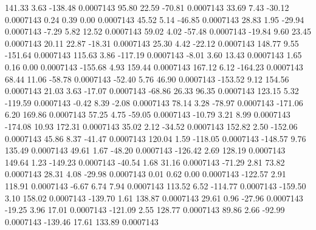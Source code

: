       141.33        3.63     -138.48     0.0007143
       95.80       22.59      -70.81     0.0007143
       33.69        7.43      -30.12     0.0007143
        0.24        0.39        0.00     0.0007143
       45.52        5.14      -46.85     0.0007143
       28.83        1.95      -29.94     0.0007143
       -7.29        5.82       12.52     0.0007143
       59.02        4.02      -57.48     0.0007143
      -19.84        9.60       23.45     0.0007143
       20.11       22.87      -18.31     0.0007143
       25.30        4.42      -22.12     0.0007143
      148.77        9.55     -151.64     0.0007143
      115.63        3.86     -117.19     0.0007143
       -8.01        3.60       13.43     0.0007143
        1.65        0.16        0.00     0.0007143
     -155.68        4.93      159.44     0.0007143
      167.12        6.12     -164.23     0.0007143
       68.44       11.06      -58.78     0.0007143
      -52.40        5.76       46.90     0.0007143
     -153.52        9.12      154.56     0.0007143
       21.03        3.63      -17.07     0.0007143
      -68.86       26.33       96.35     0.0007143
      123.15        5.32     -119.59     0.0007143
       -0.42        8.39       -2.08     0.0007143
       78.14        3.28      -78.97     0.0007143
     -171.06        6.20      169.86     0.0007143
       57.25        4.75      -59.05     0.0007143
      -10.79        3.21        8.99     0.0007143
     -174.08       10.93      172.31     0.0007143
       35.02        2.12      -34.52     0.0007143
      152.82        2.50     -152.06     0.0007143
       45.86        8.37      -41.47     0.0007143
      120.04        1.59     -118.05     0.0007143
     -148.57        9.76      135.49     0.0007143
       49.61        1.67      -48.20     0.0007143
     -126.42        2.69      128.19     0.0007143
      149.64        1.23     -149.23     0.0007143
      -40.54        1.68       31.16     0.0007143
      -71.29        2.81       73.82     0.0007143
       28.31        4.08      -29.98     0.0007143
        0.01        0.62        0.00     0.0007143
     -122.57        2.91      118.91     0.0007143
       -6.67        6.74        7.94     0.0007143
      113.52        6.52     -114.77     0.0007143
     -159.50        3.10      158.02     0.0007143
     -139.70        1.61      138.87     0.0007143
       29.61        0.96      -27.96     0.0007143
      -19.25        3.96       17.01     0.0007143
     -121.09        2.55      128.77     0.0007143
       89.86        2.66      -92.99     0.0007143
     -139.46       17.61      133.89     0.0007143
